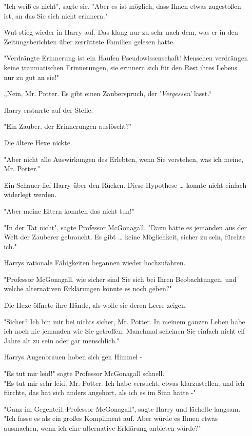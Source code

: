 {"Ich weiß es nicht", sagte sie. "Aber es ist möglich, dass Ihnen etwas zugestoßen ist, an das Sie sich nicht erinnern."

Wut stieg wieder in Harry auf. Das klang nur zu sehr nach dem, was er in den Zeitungsberichten über zerrüttete Familien gelesen hatte.

"Verdrängte Erinnerung ist ein Haufen Pseudowissenschaft! Menschen verdrängen keine traumatischen Erinnerungen, sie erinnern sich für den Rest ihres Lebens nur zu gut an sie!"

„Nein, Mr. Potter. Es gibt einen Zauberspruch, der '\emph{Vergessen'} lässt.“

Harry erstarrte auf der Stelle.

"Ein Zauber, der Erinnerungen auslöscht?"

Die ältere Hexe nickte.

"Aber nicht alle Auswirkungen des Erlebten, wenn Sie verstehen, was ich meine, Mr. Potter."

Ein Schauer lief Harry über den Rücken. Diese Hypothese … konnte nicht einfach widerlegt werden.

"Aber meine Eltern konnten das nicht tun!"

"In der Tat nicht", sagte Professor McGonagall. "Dazu hätte es jemanden aus der Welt der Zauberer gebraucht. Es gibt … keine Möglichkeit, sicher zu sein, fürchte ich."

Harrys rationale Fähigkeiten begannen wieder hochzufahren.

"Professor McGonagall, wie sicher sind Sie sich bei Ihren Beobachtungen, und welche alternativen Erklärungen könnte es noch geben?"

Die Hexe öffnete ihre Hände, als wolle sie deren Leere zeigen.

"Sicher? Ich bin mir bei nichts sicher, Mr. Potter. In meinem ganzen Leben habe ich noch nie jemanden wie Sie getroffen. Manchmal scheinen Sie einfach nicht elf Jahre alt zu sein oder gar menschlich."

Harrys Augenbrauen hoben sich gen Himmel -

"Es tut mir leid!" sagte Professor McGonagall schnell.\\ "Es tut mir sehr leid, Mr. Potter. Ich habe versucht, etwas klarzustellen, und ich fürchte, das hat sich anders angehört, als ich es im Sinn hatte -"

"Ganz im Gegenteil, Professor McGonagall", sagte Harry und lächelte langsam. "Ich fasse es als ein großes Kompliment auf. Aber würde es Ihnen etwas ausmachen, wenn ich eine alternative Erklärung anbieten würde?"

}
